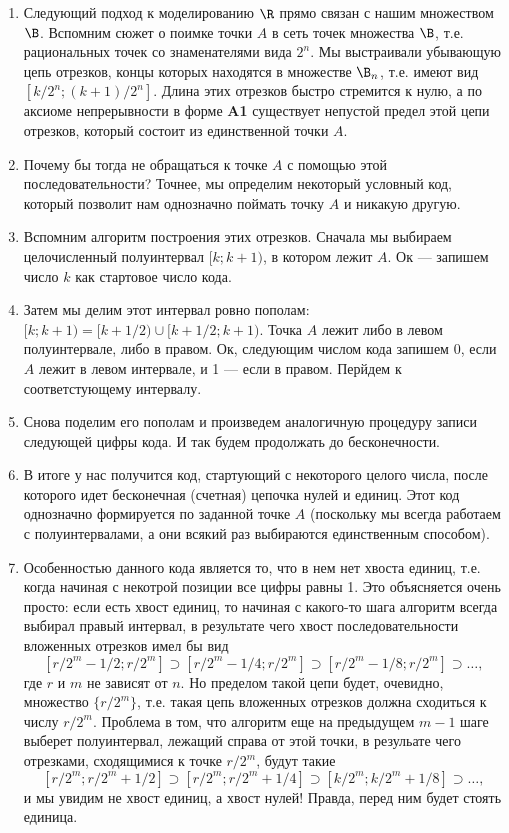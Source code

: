 \begin{enumerate}
\item Следующий подход к моделированию $\R$ прямо связан с нашим множеством $\B$. Вспомним сюжет о поимке точки $A$ в сеть точек множества $\B$, т.е. рациональных точек со знаменателями вида $2^n$. Мы выстраивали убывающую цепь отрезков, концы которых находятся в множестве $\B_n$, т.е. имеют вид $[k/2^n;(k+1)/2^n]$. Длина этих отрезков быстро стремится к нулю, а по аксиоме непрерывности в форме \textbf{A1} существует непустой предел этой цепи отрезков, который состоит из единственной точки $A$.
\item Почему бы тогда не обращаться к точке $A$ с помощью этой последовательности? Точнее, мы определим некоторый условный код, который позволит нам однозначно поймать точку $A$ и никакую другую.
\item Вспомним алгоритм построения этих отрезков. Сначала мы выбираем целочисленный полуинтервал $[k;k+1)$, в котором лежит $A$. Ок --- запишем число $k$ как стартовое число кода.
\item Затем мы делим этот интервал ровно пополам: $[k;k+1)=[k+1/2)\cup[k+1/2;k+1)$. Точка $A$ лежит либо в левом полуинтервале, либо в правом. Ок, следующим числом кода запишем 0, если $A$ лежит в левом интервале, и 1 --- если в правом. Перйдем к соответстующему интервалу.
\item Снова поделим его пополам и произведем аналогичную процедуру записи следующей цифры кода. И так будем продолжать до бесконечности.
\item В итоге у нас получится код, стартующий с некоторого целого числа, после которого идет бесконечная (счетная) цепочка нулей и единиц. Этот код однозначно формируется по заданной точке $A$ (поскольку мы всегда работаем с полуинтервалами, а они всякий раз выбираются единственным способом).
\item Особенностью данного кода является то, что в нем нет хвоста единиц, т.е. когда начиная с некотрой позиции все цифры равны 1. Это объясняется очень просто: если есть хвост единиц, то начиная с какого-то шага алгоритм всегда выбирал правый интервал, в результате чего хвост последовательности вложенных отрезков имел бы вид
$$
[r/2^m-1/2;r/2^m]\supset[r/2^m-1/4;r/2^m]\supset[r/2^m-1/8;r/2^m]\supset\dots,
$$
где $r$ и $m$ не зависят от $n$. Но пределом такой цепи будет, очевидно, множество $\{r/2^m\}$, т.е. такая цепь вложенных отрезков должна сходиться к числу $r/2^m$. Проблема в том, что алгоритм еще на предыдущем $m-1$ шаге выберет полуинтервал, лежащий справа от этой точки, в резульате чего отрезками, сходящимися к точке $r/2^m$, будут такие
$$
[r/2^m;r/2^m+1/2]\supset[r/2^m;r/2^m+1/4]\supset[k/2^m;k/2^m+1/8]\supset\dots,
$$
и мы увидим не хвост единиц, а хвост нулей! Правда, перед ним будет стоять единица.


\end{enumerate}
